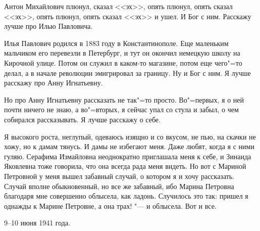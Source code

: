 Антон Михайлович плюнул, сказал <<эх>>, опять плюнул, опять сказал <<эх>>, опять плюнул, опять сказал <<эх>> и ушел. 
И Бог с ним.
Расскажу лучше про Илью Павловича.

Илья Павлович родился в 1883 году в Константинополе. 
Еще маленьким мальчиком его перевезли в Петербург, и тут он окончил немецкую  школу  на  Кирочной улице. 
Потом он служил в каком-то магазине, потом еще чего"=то делал, а в начале революции эмигрировал за границу. 
Ну и Бог с ним. 
Я лучше расскажу про Анну Игнатьевну.

Но про Анну Игнатьевну рассказать не так"=то просто.
Во"=первых, я о ней почти ничего не знаю, а во"=вторых, я сейчас упал со стула и забыл, о чем собирался рассказывать.
Я лучше расскажу о себе.

Я высокого роста, неглупый, одеваюсь изящно и со вкусом, не пью, на скачки не хожу, но к дамам тянусь.  
И дамы не избегают меня. 
Даже любят, когда я с ними гуляю. 
Серафима Измайловна неоднократно приглашала меня к себе, и Зинаида Яковлевна тоже говорила, что она всегда рада меня видеть.
Но вот с Мариной Петровной у меня вышел забавный случай, о котором я и хочу рассказать.
Случай вполне обыкновенный, но все же забавный, ибо Марина Петровна благодаря мне совершенно облысела, как ладонь. 
Случилось это так: пришел я однажды к Марине Петровне, а она трах! "--- и облысела. Вот и все.

\begin{flushright}
9--10 июня 1941 года.
\end{flushright}
